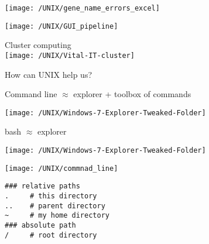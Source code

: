 \documentclass[xcolor=dvipsnames]{beamer}
\begin{document}
\begin{frame}
	\begin{center}
		\texttt{[image: /UNIX/gene\_name\_errors\_excel]}
	\end{center}
\end{frame}


\begin{frame}
	\begin{center}
		\texttt{[image: /UNIX/GUI\_pipeline]}
	\end{center}
\end{frame}


\begin{frame}
	\begin{center}
		\Huge
		Cluster computing\\
		\vspace{1cm}
		\texttt{[image: /UNIX/Vital-IT-cluster]}
	\end{center}
\end{frame}	

\begin{frame}
	\Huge
	\begin{center}
		How can UNIX help us?	
	\end{center}
\end{frame}

\begin{frame}
	Command line $\approx$ explorer + toolbox of commands
	\begin{center}
		\texttt{[image: /UNIX/Windows-7-Explorer-Tweaked-Folder]}
	\end{center}
\end{frame}

\begin{frame}
	bash $\approx$ explorer
	\begin{center}
		\texttt{[image: /UNIX/Windows-7-Explorer-Tweaked-Folder]}
	\end{center}
\end{frame}

\begin{frame}
	\begin{center}
		\texttt{[image: /UNIX/commnad\_line]}
	\end{center}
\end{frame}

\begin{frame}[fragile]
\begin{verbatim}
### relative paths
.     # this directory
..    # parent directory
~     # my home directory
### absolute path
/     # root directory
\end{verbatim}
\end{frame}
\end{document}
